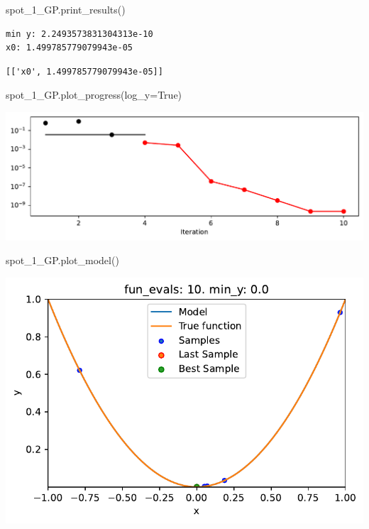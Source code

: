 \documentclass[
  letterpaper,
  DIV=11,
  numbers=noendperiod]{scrreprt}
\newenvironment{Shaded}{\begin{snugshade}}{\end{snugshade}}
\newcommand{\NormalTok}[1]{\textcolor[rgb]{0.00,0.23,0.31}{#1}}
\newcommand{\OperatorTok}[1]{\textcolor[rgb]{0.37,0.37,0.37}{#1}}
\newcommand{\VariableTok}[1]{\textcolor[rgb]{0.07,0.07,0.07}{#1}}
\begin{document}
\begin{Shaded}
\begin{Highlighting}[]
\NormalTok{spot\_1\_GP.print\_results()}
\end{Highlighting}
\end{Shaded}

\begin{verbatim}
min y: 2.2493573831304313e-10
x0: 1.499785779079943e-05
\end{verbatim}

\begin{verbatim}
[['x0', 1.499785779079943e-05]]
\end{verbatim}

\begin{Shaded}
\begin{Highlighting}[]
\NormalTok{spot\_1\_GP.plot\_progress(log\_y}\OperatorTok{=}\VariableTok{True}\NormalTok{)}
\end{Highlighting}
\end{Shaded}

\includegraphics{010_num_spot_sklearn_surrogate_files/figure-pdf/cell-26-output-1.pdf}

\begin{Shaded}
\begin{Highlighting}[]
\NormalTok{spot\_1\_GP.plot\_model()}
\end{Highlighting}
\end{Shaded}

\includegraphics{010_num_spot_sklearn_surrogate_files/figure-pdf/cell-27-output-1.pdf}
\end{document}
